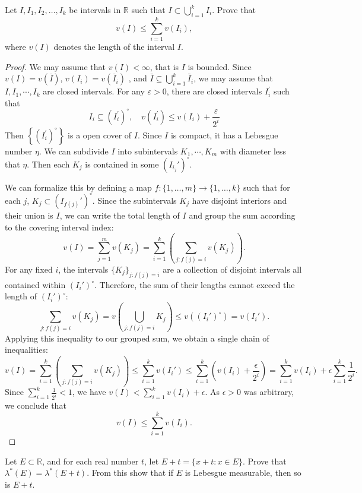 \documentclass[../main.tex]{subfiles}
\begin{document}
\begin{exercise}{}{}
Let $I, I_1, I_2, \dots, I_k$ be intervals in $\mathbb{R}$ such that $I \subset \bigcup_{i=1}^k I_i$. Prove that
\[
v(I) \le \sum_{i=1}^k v(I_i),
\]
where $v(I)$ denotes the length of the interval $I$.
\end{exercise}

\begin{proof}
   We may assume that \(  v\left( I \right)< \infty   \), that is \(  I  \) is bounded.     Since \(  v\left( I \right)= v\left( \overline{I} \right)    \), \(  v\left( I _{i} \right)=  v\left( \overline{I} _{i} \right)    \) , and \(  \bar{I}\subseteq \bigcup _{ i = 1}^{k} \bar{I}_{i}  \), we may assume that \(  I,I_1,\cdots , I _{k}  \) are closed intervals. For any \(   \varepsilon > 0  \), there are closed intervals \(  I^{\prime} _{i}  \) such that \[
     I _{i}\subseteq \left( I^{\prime} _{i} \right)^{\circ},\quad  v\left( I _{i}^{\prime}  \right)\le v\left( I _{i} \right)+ \frac{ \varepsilon  }{2^{i} }   
     \] Then \(  \left\{\left(  I _{i}^{\prime} \right) ^{\circ}    \right\}\) is a open cover of  \(  I  \).        Since \(  I  \) is compact, it has a Lebesgue number \(  \eta   \).   We can subdivide \(  I  \) into subintervals  \(  K_1,\cdots ,K_{m}  \) with diameter  less that \(  \eta   \). Then each \(K_j\) is contained in some \((I_{i_j}')^\circ\).

We can formalize this by defining a map \(f: \{1, \dots, m\} \to \{1, \dots, k\}\) such that for each \(j\), \(K_j \subset (I_{f(j)}')^\circ\). Since the subintervals \(K_j\) have disjoint interiors and their union is \(I\), we can write the total length of \(I\) and group the sum according to the covering interval index:
\[
v(I) = \sum_{j=1}^m v(K_j) = \sum_{i=1}^k \left( \sum_{j: f(j)=i} v(K_j) \right).
\]
For any fixed \(i\), the intervals \(\{K_j\}_{j: f(j)=i}\) are a collection of disjoint intervals all contained within \((I_i')^\circ\). Therefore, the sum of their lengths cannot exceed the length of \((I_i')^\circ\):
\[
\sum_{j: f(j)=i} v(K_j) = v\left(\bigcup_{j: f(j)=i} K_j\right) \le v((I_i')^\circ) = v(I_i').
\]
Applying this inequality to our grouped sum, we obtain a single chain of inequalities:
\[
v(I) = \sum_{i=1}^k \left( \sum_{j: f(j)=i} v(K_j) \right) \le \sum_{i=1}^k v(I_i') \le \sum_{i=1}^k \left( v(I_i) + \frac{\epsilon}{2^i} \right) = \sum_{i=1}^k v(I_i) + \epsilon \sum_{i=1}^k \frac{1}{2^i}.
\]
Since \(\sum_{i=1}^k \frac{1}{2^i} < 1\), we have \(v(I) < \sum_{i=1}^k v(I_i) + \epsilon\). As \(\epsilon > 0\) was arbitrary, we conclude that
\[
v(I) \le \sum_{i=1}^k v(I_i).
\]

\end{proof}
\begin{exercise}{}{}
Let $E \subset \mathbb{R}$, and for each real number $t$, let $E + t = \{x + t : x \in E\}$.
Prove that $\lambda^*(E) = \lambda^*(E + t)$. From this show that if $E$ is Lebesgue measurable, then so is $E + t$.
\end{exercise}
\end{document}
